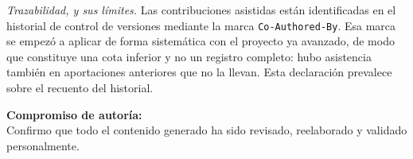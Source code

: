 \vspace{0.5em}
\noindent\textit{Trazabilidad, y sus límites.} Las contribuciones asistidas
están identificadas en el historial de control de versiones mediante la marca
\texttt{Co-Authored-By}. Esa marca se empezó a aplicar de forma sistemática con
el proyecto ya avanzado, de modo que constituye una cota inferior y no un
registro completo: hubo asistencia también en aportaciones anteriores que no la
llevan. Esta declaración prevalece sobre el recuento del historial.

\vspace{2em}
\noindent\textbf{Compromiso de autoría:}\\
Confirmo que todo el contenido generado ha sido revisado, reelaborado y validado
personalmente.
